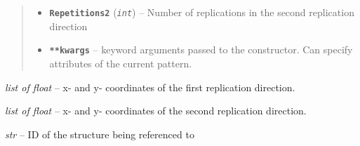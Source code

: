 \documentclass[letterpaper,10pt,english]{sphinxmanual}
\begin{document}
\begin{fulllineitems}
\begin{quote}
\begin{description}
\begin{itemize}
\item {} 
\textbf{\texttt{Repetitions2}} (\emph{\texttt{int}}) -- Number of replications in the second replication direction

\item {} 
\textbf{\texttt{**kwargs}} -- keyword arguments passed to the {\hyperref[Chapters/PythonModuleReference/Patterns/TXLWizard.Patterns.AbstractPattern:TXLWizard.Patterns.AbstractPattern.AbstractPattern]{}} constructor.
Can specify attributes of the current pattern.

\end{itemize}

\end{description}\end{quote}

\begin{fulllineitems}
\label{Chapters/PythonModuleReference/Patterns/TXLWizard.Patterns.Array:TXLWizard.Patterns.Array.Array.PositionDelta1}
\emph{list of float} -- x- and y- coordinates of the first replication direction.

\end{fulllineitems}


\begin{fulllineitems}
\label{Chapters/PythonModuleReference/Patterns/TXLWizard.Patterns.Array:TXLWizard.Patterns.Array.Array.PositionDelta2}
\emph{list of float} -- x- and y- coordinates of the second replication direction.

\end{fulllineitems}


\begin{fulllineitems}
\label{Chapters/PythonModuleReference/Patterns/TXLWizard.Patterns.Array:TXLWizard.Patterns.Array.Array.ReferencedStructureID}
\emph{str} -- ID of the structure being referenced to

\end{fulllineitems}



\end{fulllineitems}
\end{document}
